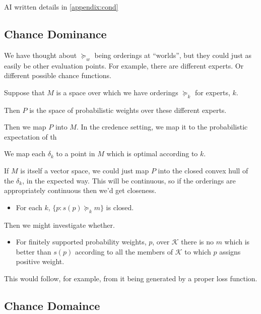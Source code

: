 \documentclass[11pt]{article}
\theoremstyle{definition}
\theoremstyle{remark}
\begin{document}
AI written details in \cref{appendix:cond}

\subsection{Chance Dominance}

We have thought about $\succeq_w$ being orderings at ``worlds'', but they could just as easily be other evaluation points. For example, there are different experts. Or different possible chance functions. 

Suppose that $M$ is a space over which we have orderings $\succeq_k$ for experts, $k$. 

Then $P$ is the space of probabilistic weights over these different experts. 

Then we map $P$ into $M$. In the credence setting, we map it to the probabilistic expectation of th

We map each $\delta_k$ to a point in $M$ which is optimal according to $k$.

If $M$ is itself a vector space, we could just map $P$ into the closed convex hull of the $\delta_k$, in the expected way. This will be continuous, so if the orderings are appropriately continuous then we'd get closeness. 
	\begin{itemize}
	\item For each $k$, $\{p : s(p)\succeq_k m\}$ is closed.
\end{itemize}
Then we might investigate whether. 
	\begin{itemize}
	\item For finitely supported probability weights, $p$, over $\mathcal K$ there is no $m$ which is better than $s(p)$ according to all the members of $\mathcal K$ to which $p$ assigns positive weight. 
\end{itemize}
This would follow, for example, from it being generated by a proper loss function. 



\subsection{Chance Domaince}
\end{document}
